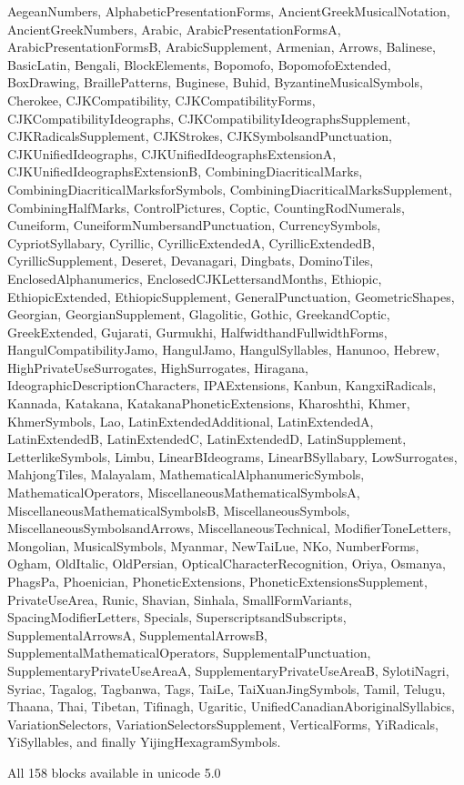 \documentclass[12pt]{article}
\begin{document}
  \begin{block}  
    AegeanNumbers, AlphabeticPresentationForms, AncientGreekMusicalNotation,
    AncientGreekNumbers, Arabic, ArabicPresentationFormsA,
    ArabicPresentationFormsB, ArabicSupplement, Armenian, Arrows,
    Balinese, BasicLatin, Bengali, BlockElements, Bopomofo,
    BopomofoExtended, BoxDrawing, BraillePatterns, Buginese,
    Buhid, ByzantineMusicalSymbols, Cherokee, CJKCompatibility,
    CJKCompatibilityForms, CJKCompatibilityIdeographs,
    CJKCompatibilityIdeographsSupplement, CJKRadicalsSupplement,
    CJKStrokes, CJKSymbolsandPunctuation, CJKUnifiedIdeographs,
    CJKUnifiedIdeographsExtensionA, CJKUnifiedIdeographsExtensionB,
    CombiningDiacriticalMarks, CombiningDiacriticalMarksforSymbols,
    CombiningDiacriticalMarksSupplement, CombiningHalfMarks, ControlPictures,
    Coptic, CountingRodNumerals, Cuneiform, CuneiformNumbersandPunctuation,
    CurrencySymbols, CypriotSyllabary, Cyrillic, CyrillicExtendedA,
    CyrillicExtendedB, CyrillicSupplement, Deseret, Devanagari, Dingbats,
    DominoTiles, EnclosedAlphanumerics, EnclosedCJKLettersandMonths,
    Ethiopic, EthiopicExtended, EthiopicSupplement, GeneralPunctuation,
    GeometricShapes, Georgian, GeorgianSupplement, Glagolitic, Gothic,
    GreekandCoptic, GreekExtended, Gujarati, Gurmukhi, HalfwidthandFullwidthForms,
    HangulCompatibilityJamo, HangulJamo, HangulSyllables, Hanunoo, Hebrew,
    HighPrivateUseSurrogates, HighSurrogates, Hiragana, IdeographicDescriptionCharacters,
    IPAExtensions, Kanbun, KangxiRadicals, Kannada, Katakana, KatakanaPhoneticExtensions,
    Kharoshthi, Khmer, KhmerSymbols, Lao, LatinExtendedAdditional, LatinExtendedA,
    LatinExtendedB, LatinExtendedC, LatinExtendedD, LatinSupplement,
    LetterlikeSymbols, Limbu, LinearBIdeograms, LinearBSyllabary, LowSurrogates,
    MahjongTiles, Malayalam, MathematicalAlphanumericSymbols, MathematicalOperators,
    MiscellaneousMathematicalSymbolsA, MiscellaneousMathematicalSymbolsB,
    MiscellaneousSymbols, MiscellaneousSymbolsandArrows, MiscellaneousTechnical,
    ModifierToneLetters, Mongolian, MusicalSymbols, Myanmar, NewTaiLue, NKo,
    NumberForms, Ogham, OldItalic, OldPersian, OpticalCharacterRecognition,
    Oriya, Osmanya, PhagsPa, Phoenician, PhoneticExtensions, PhoneticExtensionsSupplement,
    PrivateUseArea, Runic, Shavian, Sinhala, SmallFormVariants,
    SpacingModifierLetters, Specials, SuperscriptsandSubscripts,
    SupplementalArrowsA, SupplementalArrowsB, SupplementalMathematicalOperators,
    SupplementalPunctuation, SupplementaryPrivateUseAreaA,
    SupplementaryPrivateUseAreaB, SylotiNagri, Syriac, Tagalog,
    Tagbanwa, Tags, TaiLe, TaiXuanJingSymbols, Tamil, Telugu,
    Thaana, Thai, Tibetan, Tifinagh, Ugaritic, UnifiedCanadianAboriginalSyllabics,
    VariationSelectors, VariationSelectorsSupplement, VerticalForms,
    YiRadicals, YiSyllables, and finally YijingHexagramSymbols.
    \caption{All 158 blocks available in unicode 5.0}
  \end{block}
\end{document}
